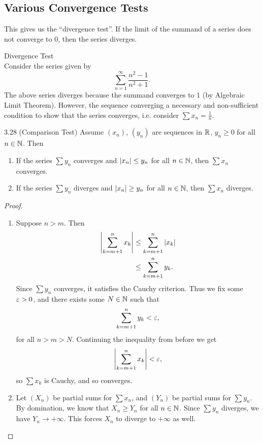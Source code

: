 \documentclass[class=article, crop=false]{standalone}
\begin{document}
  \subsection{Various Convergence Tests}
  \begin{note}{}
    This gives us the ``divergence test''. If the limit of the summand of a series does not converge to $0$, then the series diverges.
  \end{note}
  \begin{example}{Divergence Test} \\
    Consider the series given by
    \[
      \sum_{n=1}^{\infty} \frac{n^2 - 1}{n^2 + 1}.
    \]
    The above series diverges because the summand converges to $1$ (by Algebraic Limit Theorem). However, the sequence converging a necessary and non-sufficient condition to show that the series converges, i.e. consider $\sum x_n = \frac{1}{n}$.
  \end{example}
  \begin{theorem}{3.28 (Comparison Test)}
    Assume $(x_n)$, $(y_n)$ are sequences in $\mathbb{R}$, $y_n\geq 0$ for all $n\in\mathbb{N}$. Then
    \begin{enumerate}[label=(\roman*)]
      \item If the series $\sum y_n$ converges and $\left\lvert x_n \right\rvert\leq y_n$ for all $n\in\mathbb{N}$, then $\sum x_n$ converges.
      \item If the series $\sum y_n$ diverges and $\left\lvert x_n \right\rvert\geq y_n$ for all $n\in\mathbb{N}$, then $\sum x_n$ diverges.
    \end{enumerate}
    \begin{proof}
      \begin{enumerate}[label=(\roman*)]
        \item Suppose $n > m$. Then
        \begin{align*}
          \left\lvert \sum_{k=m+1}^{n}x_k \right\rvert &\leq \sum_{k=m+1}^{n}\left\lvert x_k \right\rvert \\
                                    &\leq \sum_{k=m+1}^{n}y_k.
        \end{align*}
        Since $\sum y_n$ converges, it satisfies the Cauchy criterion. Thus we fix some $\varepsilon > 0$, and there exists some $N\in\mathbb{N}$ such that
        \[
          \sum_{k=m+1}^{n}y_k < \varepsilon,
        \]
        for all $n > m > N$. Continuing the inequality from before we get
        \[
          \left\lvert \sum_{k=m+1}^{n}x_k \right\rvert < \varepsilon,
        \]
        so $\sum x_k$ is Cauchy, and so converges.
        \item Let $(X_n)$ be partial sums for $\sum x_n$, and $(Y_n)$ be partial sums for $\sum y_n$. By domination, we know that $X_n\geq Y_n$ for all $n\in\mathbb{N}$. Since $\sum y_n$ diverges, we have $Y_n\to+\infty$. This forces $X_n$ to diverge to $+\infty$ as well.
      \end{enumerate}
    \end{proof}
  \end{theorem}
\end{document}
